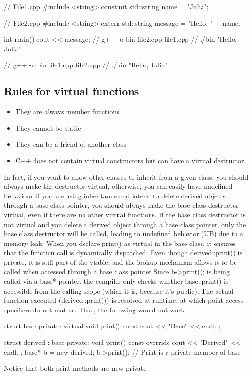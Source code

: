 \documentclass{report}
\begin{document}
\bigbreak \noindent 
\begin{cppcode}
    // File1.cpp
    #include <string>
    constinit std::string name = "Julia";

    // File2.cpp
    #include <string>
    extern std::string message = "Hello, " + name;

    int main() {cout << message;}
    // g++ -o bin file2.cpp file1.cpp
    // ./bin "Hello, Julia"

    // g++ -o bin file1.cpp file2.cpp
    // ./bin "Hello, Julia"
\end{cppcode}

\pagebreak 
{}
\bigbreak \noindent 
\subsection{Rules for virtual functions}
\bigbreak \noindent 
\begin{itemize}
    \item They are always member functions
    \item They cannot be static
    \item They can be a friend of another class
    \item C++ does not contain virtual constructors but can have a virtual destructor
\end{itemize}
\bigbreak \noindent 
In fact, if you want to allow other classes to inherit from a given class, you should always make the destructor virtual, otherwise, you can easily have undefined behaviour
\bigbreak \noindent 
if you are using inheritance and intend to delete derived objects through a base class pointer, you should always make the base class destructor virtual, even if there are no other virtual functions.
\bigbreak \noindent 
If the base class destructor is not virtual and you delete a derived object through a base class pointer, only the base class destructor will be called, leading to undefined behavior (UB) due to a memory leak.
\bigbreak \noindent 
When you declare print() as virtual in the base class, it ensures that the function call is dynamically dispatched.
\bigbreak \noindent 
Even though derived::print() is private, it is still part of the vtable, and the lookup mechanism allows it to be called when accessed through a base class pointer
\bigbreak \noindent 
Since b->print(); is being called via a base* pointer, the compiler only checks whether base::print() is accessible from the calling scope (which it is, because it's public).
\bigbreak \noindent 
The actual function executed (derived::print()) is resolved at runtime, at which point access specifiers do not matter.
\bigbreak \noindent 
Thus, the following would not work
\bigbreak \noindent 
\begin{cppcode}
    struct base {
        private:
        virtual void print() const {cout << "Base" << endl;}
    };

    struct derived : base{
        private:
        void print() const override {cout << "Derived" << endl;}
    };
    base* b = new derived{};
    b->print(); // Print is a private member of base
\end{cppcode}
\bigbreak \noindent 
Notice that both print methods are now private
\bigbreak \noindent 
\end{document}
